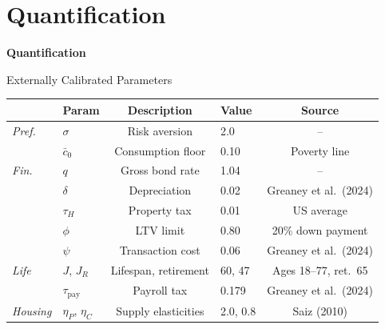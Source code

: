\documentclass[11pt,aspectratio=169]{beamer}
\begin{document}
\section{Quantification}

\begin{frame}
\centering
{\Large\textbf{Quantification}}
\end{frame}

\begin{frame}{Externally Calibrated Parameters}
\small
\renewcommand{\arraystretch}{0.95}
\centering
\begin{tabular}{llclc}
\toprule
& \textbf{Param} & \textbf{Description} & \textbf{Value} & \textbf{Source} \\
\midrule
\textit{Pref.} & $\sigma$ & Risk aversion & 2.0 & -- \\
& $\bar c_0$ & Consumption floor & 0.10 & Poverty line \\
\midrule
\textit{Fin.} & $q$ & Gross bond rate & 1.04 & -- \\
& $\delta$ & Depreciation & 0.02 & Greaney et al.\ (2024) \\
& $\tau_H$ & Property tax & 0.01 & US average \\
& $\phi$ & LTV limit & 0.80 & 20\% down payment \\
& $\psi$ & Transaction cost & 0.06 & Greaney et al.\ (2024) \\
\midrule
\textit{Life} & $J$, $J_R$ & Lifespan, retirement & 60, 47 & Ages 18--77, ret.\ 65 \\
& $\tau_{\text{pay}}$ & Payroll tax & 0.179 & Greaney et al.\ (2024) \\
\midrule
\textit{Housing} & $\eta_P$, $\eta_C$ & Supply elasticities & 2.0, 0.8 & Saiz (2010) \\
\bottomrule
\end{tabular}
\end{frame}
\end{document}
